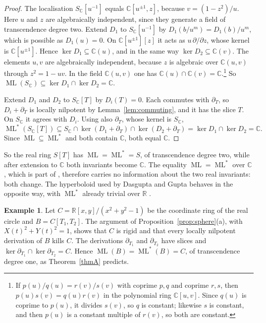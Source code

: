 \documentclass[11pt]{amsart}
\theoremstyle{definition}
\newtheorem{example}[theorem]{Example}
\newcommand{\RR}{\mathbb{R}}
\newcommand{\CC}{\mathbb{C}}
\DeclareMathOperator{\ML}{ML}
\newcommand{\MLs}{\ML^{*}}
\begin{document}
\begin{proof}
The localisation $S_\CC[u^{-1}]$ equals $\CC[u^{\pm1},z]$, because $v=(1-z^2)/u$. Here $u$ and $z$ are algebraically independent, since they generate a field of transcendence degree two. Extend $D_1$ to $S_\CC[u^{-1}]$ by $D_1(b/u^m)=D_1(b)/u^m$, which is possible as $D_1(u)=0$. On $\CC[u^{\pm1}][z]$ it acts as $u\,\partial/\partial z$, whose kernel is $\CC[u^{\pm1}]$. Hence $\ker D_1\subseteq\CC(u)$, and in the same way $\ker D_2\subseteq\CC(v)$. The elements $u,v$ are algebraically independent, because $z$ is algebraic over $\CC(u,v)$ through $z^2=1-uv$. In the field $\CC(u,v)$ one has $\CC(u)\cap\CC(v)=\CC$.\footnote{If $p(u)/q(u)=r(v)/s(v)$ with coprime $p,q$ and coprime $r,s$, then $p(u)s(v)=q(u)r(v)$ in the polynomial ring $\CC[u,v]$. Since $q(u)$ is coprime to $p(u)$, it divides $s(v)$, so $q$ is constant; likewise $s$ is constant, and then $p(u)$ is a constant multiple of $r(v)$, so both are constant.} So $\ML(S_\CC)\subseteq\ker D_1\cap\ker D_2=\CC$.

Extend $D_1$ and $D_2$ to $S_\CC[T]$ by $D_i(T)=0$. Each commutes with $\partial_T$, so $D_i+\partial_T$ is locally nilpotent by Lemma~\ref{lem:commuting}, and it has the slice $T$. On $S_\CC$ it agrees with $D_i$. Using also $\partial_T$, whose kernel is $S_\CC$,
\[
\MLs(S_\CC[T])\subseteq S_\CC\cap\ker(D_1+\partial_T)\cap\ker(D_2+\partial_T)=\ker D_1\cap\ker D_2=\CC .
\]
Since $\ML\subseteq\MLs$ and both contain $\CC$, both equal $\CC$.
\end{proof}

So the real ring $S[T]$ has $\ML=\MLs=S$, of transcendence degree two, while after extension to $\CC$ both invariants become $\CC$. The equality $\ML=\MLs$ over $\CC$, which is part of \cite[Theorem~1]{GS24}, therefore carries no information about the two real invariants: both change. The hyperboloid used by Dasgupta and Gupta behaves in the opposite way, with $\MLs$ already trivial over $\RR$ \cite{DG21}.

\begin{example}\label{ex:circle}
Let $C=\RR[x,y]/(x^2+y^2-1)$ be the coordinate ring of the real circle and $B=C[T_1,T_2]$. The argument of Proposition~\ref{prop:sphere}(a), with $X(t)^2+Y(t)^2=1$, shows that $C$ is rigid and that every locally nilpotent derivation of $B$ kills $C$. The derivations $\partial_{T_1}$ and $\partial_{T_2}$ have slices and $\ker\partial_{T_1}\cap\ker\partial_{T_2}=C$. Hence $\ML(B)=\MLs(B)=C$, of transcendence degree one, as Theorem~\ref{thmA} predicts.
\end{example}
\end{document}
